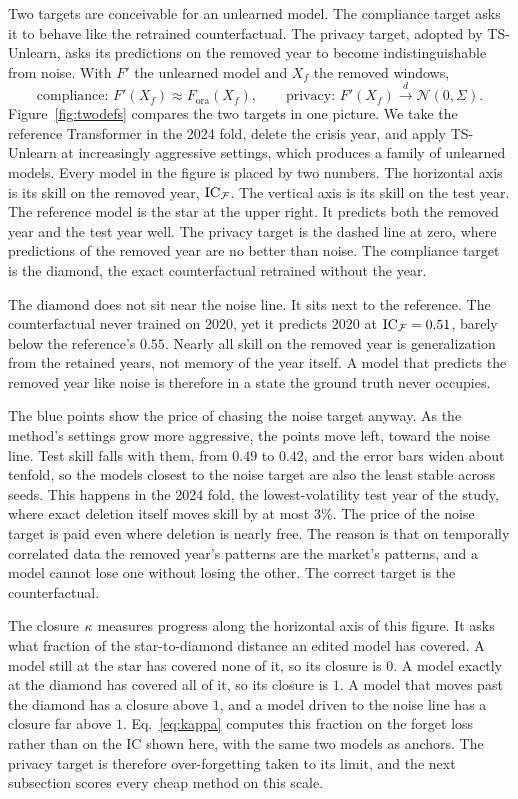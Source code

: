 Two targets are conceivable for an unlearned model. The compliance
target asks it to behave like the retrained counterfactual. The
privacy target, adopted by TS-Unlearn, asks its predictions on the
removed year to become indistinguishable from noise. With $F'$ the
unlearned model and $X_f$ the removed windows,
\begin{equation}
\text{compliance: } F'(X_f) \approx F_{\text{ora}}(X_f),
\qquad
\text{privacy: } F'(X_f) \stackrel{d}{\to} \mathcal{N}(0,\Sigma).
\label{eq:compliance}
\end{equation}
Figure~\ref{fig:twodefs} compares the two targets in one picture.
We take the reference Transformer in the 2024 fold, delete the
crisis year, and apply TS-Unlearn at increasingly aggressive
settings, which produces a
family of unlearned models. Every model in the figure is placed by
two numbers. The horizontal axis is its skill on the removed year,
$\mathrm{IC}_{\mathcal{F}}$. The vertical axis is its skill on the test year. The
reference model is the star at the upper right. It predicts both the
removed year and the test year well. The privacy target is the
dashed line at zero, where predictions of the removed year are no
better than noise. The compliance target is the diamond, the exact
counterfactual retrained without the year.

The diamond does not sit near the noise line. It sits next to the
reference. The counterfactual never trained on 2020, yet it predicts
2020 at $\mathrm{IC}_{\mathcal{F}} = 0.51$, barely below the reference's $0.55$.
Nearly all skill on the removed year is generalization from the
retained years, not memory of the year itself. A model that predicts
the removed year like noise is therefore in a state the ground truth
never occupies.

The blue points show the price of chasing the noise target anyway.
As the method's settings grow more aggressive, the points move left,
toward the noise line. Test skill falls with them, from $0.49$ to
$0.42$, and the error bars widen about tenfold, so the models
closest to the noise target are also the least stable across seeds.
This happens in the 2024 fold, the lowest-volatility test year of
the study, where exact deletion itself moves skill by at most
$3\%$. The price of the noise target is paid even where deletion is
nearly free.
The reason is that on temporally correlated data the removed year's
patterns are the market's patterns, and a model cannot lose one
without losing the other. The correct target is the counterfactual.

The closure $\kappa$ measures progress along the horizontal
axis of this figure. It asks what fraction of the star-to-diamond
distance an edited model has covered. A model still at the star has
covered none of it, so its closure is $0$. A model exactly at the
diamond has covered all of it, so its closure is $1$. A model that
moves past the diamond has a closure above $1$, and a model driven
to the noise line has a closure far above $1$. Eq.~\ref{eq:kappa}
computes this fraction on the forget loss rather than on the IC
shown here, with the same two models as anchors. The privacy target
is therefore over-forgetting taken to its limit, and the next
subsection scores every cheap method on this scale.

